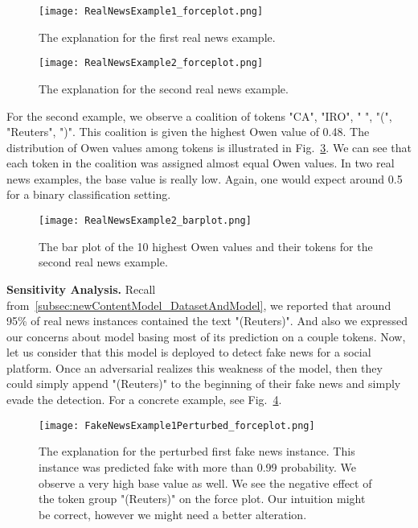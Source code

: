 \begin{figure}
    \centering
    \texttt{[image: RealNewsExample1\_forceplot.png]}
    \caption[The explanation for the first real news example.]{The explanation for the first real news example.}
    \label{fig:RealNewsExample1_forceplot}
\end{figure}
\begin{figure}
    \centering
    \texttt{[image: RealNewsExample2\_forceplot.png]}
    \caption[The explanation for the second real news example.]{The explanation for the second real news example.}
    \label{fig:RealNewsExample2_forceplot}
\end{figure}
For the second example, we observe a coalition of tokens "CA", "IRO", " ", "(", "Reuters", ")". This coalition is given the highest Owen value of 0.48. The distribution of Owen values among tokens is illustrated in Fig.~\ref{fig:RealNewsExample2_barplot}. We can see that each token in the coalition was assigned almost equal Owen values. In two real news examples, the base value is really low. Again, one would expect around 0.5 for a binary classification setting.
\begin{figure}
    \centering
    \texttt{[image: RealNewsExample2\_barplot.png]}
    \caption[The bar plot of the 10 highest Owen values and their tokens for the second real news example.]{The bar plot of the 10 highest Owen values and their tokens for the second real news example.}
    \label{fig:RealNewsExample2_barplot}
\end{figure}
\textbf{Sensitivity Analysis.} Recall from~\ref{subsec:newContentModel_DatasetAndModel}, we reported that around 95\% of real news instances contained the text "(Reuters)". And also we expressed our concerns about model basing most of its prediction on a couple tokens. Now, let us consider that this model is deployed to detect fake news for a social platform. Once an adversarial realizes this weakness of the model, then they could simply append "(Reuters)" to the beginning of their fake news and simply evade the detection. For a concrete example, see Fig.~\ref{fig:FakeNewsExample1Perturbed_forceplot}.\\
\begin{figure}
    \centering
    \texttt{[image: FakeNewsExample1Perturbed\_forceplot.png]}
    \caption[The explanation for the perturbed first fake news instance.]{The explanation for the perturbed first fake news instance. This instance was predicted fake with more than 0.99 probability. We observe a very high base value as well. We see the negative effect of the token group "(Reuters)" on the force plot. Our intuition might be correct, however we might need a better alteration.}
    \label{fig:FakeNewsExample1Perturbed_forceplot}
\end{figure}
